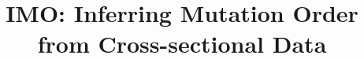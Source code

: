 \documentclass[]{article}
\title{IMO: Inferring Mutation Order from Cross-sectional Data}
\author{}
\begin{document}
	
	\maketitle
	
	
	\begin{abstract}
		
	\end{abstract}
	
	
	
	

    
	
	
	
	
	
	
	
	
\end{document}
